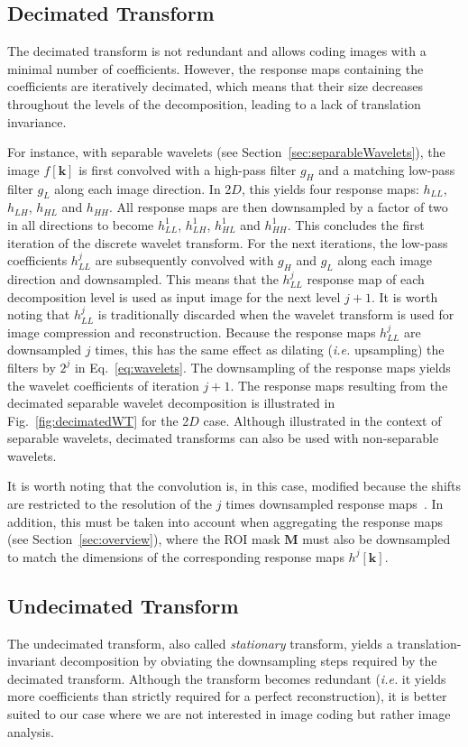 \documentclass[fleqn,a4paper,oneside,openany]{book}
\begin{document}
\subsection{Decimated Transform}\label{sec:decimatedWT}
%
The decimated transform is not redundant and allows coding images with a minimal number of coefficients.
However, the response maps containing the coefficients are iteratively decimated, which means that their size decreases throughout the levels of the decomposition, leading to a lack of translation invariance.

For instance, with separable wavelets (see Section~\ref{sec:separableWavelets}), the image $f[\boldsymbol{k}]$ is first convolved with a high-pass filter $g_H$ and a matching low-pass filter $g_L$ along each image direction.
In 2$D$, this yields four response maps: $h_{LL}$, $h_{LH}$, $h_{HL}$ and $h_{HH}$.
All response maps are then downsampled by a factor of two in all directions to become $h_{LL}^1$, $h_{LH}^1$, $h_{HL}^1$ and $h_{HH}^1$.
This concludes the first iteration of the discrete wavelet transform.
%
For the next iterations, the low-pass coefficients $h_{LL}^j$ are subsequently convolved with $g_H$ and $g_L$ along each image direction and downsampled. 
This means that the $h_{LL}^j$ response map of each decomposition level is used as input image for the next level $j+1$.
It is worth noting that $h_{LL}^j$ is traditionally discarded when the wavelet transform is used for image compression and reconstruction.
Because the response maps $h_{LL}^j$ are downsampled $j$ times, this has the same effect as dilating (\textit{i.e.} upsampling) the filters by $2^j$ in Eq.~\eqref{eq:wavelets}.
The downsampling of the response maps yields the wavelet coefficients of iteration $j+1$.
The response maps resulting from the decimated separable wavelet decomposition is illustrated in Fig.~\ref{fig:decimatedWT} for the 2$D$ case.
Although illustrated in the context of separable wavelets, decimated transforms can also be used with non-separable wavelets.

It is worth noting that the convolution is, in this case, modified because the shifts are restricted to the resolution of the $j$ times downsampled response maps~\cite{Dau1992}. In addition, this must be taken into account when aggregating the response maps (see Section~\ref{sec:overview}), where the ROI mask $\boldsymbol{M}$ must also be downsampled to match the dimensions of the corresponding response maps $h^j[\boldsymbol{k}]$.

\subsection{Undecimated Transform}\label{sec:undecimatedWT}
%
The undecimated transform, also called \emph{stationary} transform, yields a translation-invariant decomposition by obviating the downsampling steps required by the decimated transform. Although the transform becomes redundant (\textit{i.e.} it yields more coefficients than strictly required for a perfect reconstruction), it is better suited to our case where we are not interested in image coding but rather image analysis.
\end{document}

